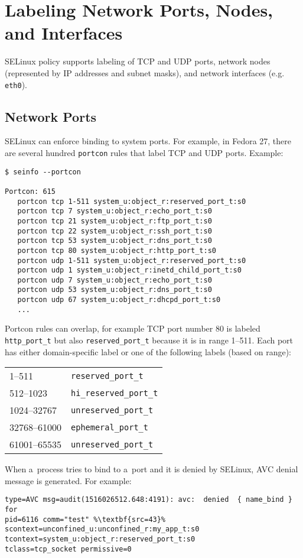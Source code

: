 \section{Labeling Network Ports, Nodes, and Interfaces}
\label{networkobjects}
SELinux policy supports labeling of TCP and UDP ports, network nodes
(represented by IP addresses and subnet masks), and network interfaces (e.g.
\texttt{eth0}).

\subsection{Network Ports}
SELinux can enforce binding to system ports. For example, in Fedora 27, there
are several hundred \texttt{portcon} rules that label TCP and UDP ports.
Example:
\begin{lstlisting}
$ seinfo --portcon

Portcon: 615
   portcon tcp 1-511 system_u:object_r:reserved_port_t:s0
   portcon tcp 7 system_u:object_r:echo_port_t:s0
   portcon tcp 21 system_u:object_r:ftp_port_t:s0
   portcon tcp 22 system_u:object_r:ssh_port_t:s0
   portcon tcp 53 system_u:object_r:dns_port_t:s0
   portcon tcp 80 system_u:object_r:http_port_t:s0
   portcon udp 1-511 system_u:object_r:reserved_port_t:s0
   portcon udp 1 system_u:object_r:inetd_child_port_t:s0
   portcon udp 7 system_u:object_r:echo_port_t:s0
   portcon udp 53 system_u:object_r:dns_port_t:s0
   portcon udp 67 system_u:object_r:dhcpd_port_t:s0
   ...
\end{lstlisting}
Portcon rules can overlap, for example TCP port number 80 is labeled
\texttt{http\_port\_t} but also \texttt{reserved\_port\_t} because it is in range
1--511. Each port has either domain-specific label or one of the following
labels (based on range):

\begin{tabular}{l l}
    1--511 & \texttt{reserved\_port\_t} \\
    512--1023 & \texttt{hi\_reserved\_port\_t} \\
    1024--32767 & \texttt{unreserved\_port\_t} \\
    32768--61000 & \texttt{ephemeral\_port\_t} \\
    61001--65535 & \texttt{unreserved\_port\_t} \\
\end{tabular}

\pagebreak

When a~process tries to bind to a~port and it is denied by SELinux, AVC denial
message is generated. For example:
\begin{lstlisting}[escapechar=\%]
type=AVC msg=audit(1516026512.648:4191): avc:  denied  { name_bind } for
pid=6116 comm="test" %\textbf{src=43}% scontext=unconfined_u:unconfined_r:my_app_t:s0
tcontext=system_u:object_r:reserved_port_t:s0
tclass=tcp_socket permissive=0
\end{lstlisting}

